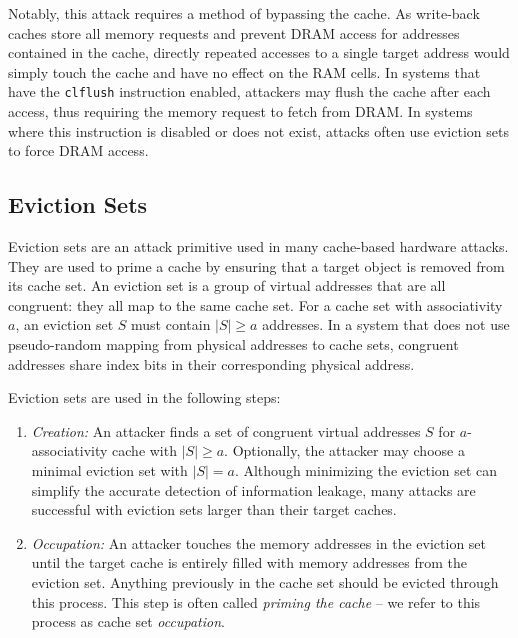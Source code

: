 \documentclass[letterpaper]{article}
\begin{document}
Notably, this attack requires a method of bypassing the cache.
As write-back caches store all memory requests and prevent DRAM access for addresses contained in the cache,
directly repeated accesses to a single target address would simply touch the cache
and have no effect on the RAM cells.
In systems that have the \texttt{clflush} instruction enabled,
attackers may flush the cache after each access,
thus requiring the memory request to fetch from DRAM.
In systems where this instruction is disabled or does not exist,
attacks often use eviction sets to force DRAM access.


\subsection{Eviction Sets}
Eviction sets are an attack primitive used in many cache-based hardware attacks.
They are used to prime a cache by ensuring that a target object is removed from its cache set.
An eviction set is a group of virtual addresses that are all congruent: they all map to the same cache set.
For a cache set with associativity $a$, an eviction set $S$ must contain $|S| \geq a$ addresses.
In a system that does not use pseudo-random mapping from physical addresses to cache sets,
congruent addresses share index bits in their corresponding physical address.


Eviction sets are used in the following steps:

\begin{enumerate}
    \item \textit{Creation:} An attacker finds a set of congruent virtual addresses $S$ for $a$-associativity cache with $|S| \geq a$. Optionally, the attacker may choose a minimal eviction set with $|S|=a$.
    Although minimizing the eviction set can simplify the accurate detection of information leakage,
    many attacks are successful with eviction sets larger than their target caches.

    \item \textit{Occupation:} An attacker touches the memory addresses in the eviction set until the target cache is entirely filled with memory addresses from the eviction set.
    Anything previously in the cache set should be evicted through this process.
    This step is often called \textit{priming the cache} – we refer to this process as cache set \textit{occupation}.
\end{enumerate}
\end{document}
